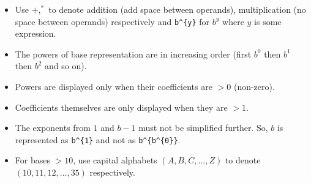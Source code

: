 \documentclass[../../Problems]{subfiles}
\begin{document}
\begin{itemize}
\item Use \texttt{$+, ^*$} to denote addition (add space between operands), multiplication (no space between operands) respectively and \verb!b^{y}! for $b^y$ where $y$ is some expression.
\item The powers of base representation are in increasing order (first $b^0$ then $b^1$ then $b^2$ and so on).
\item Powers are displayed only when their coefficients are $>0$ (non-zero).
\item Coefficients themselves are only displayed when they are $>1$.
\item The exponents from $1$ and $b-1$ must not be simplified further. So, $b$ is represented as \verb!b^{1}! and not as \verb!b^{b^{0}}!.
\item For bases $>10$, use capital alphabets $(A,B,C,\ldots,Z)$ to denote $(10,11,12,\ldots,35)$ respectively.
\end{itemize}
\end{document}
